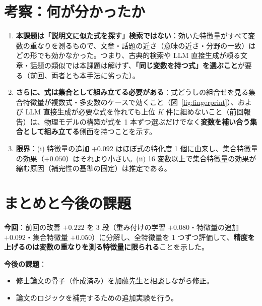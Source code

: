 \documentclass[a4j,dvipdfmx,11pt]{jresume}
\begin{document}
\section{考察：何が分かったか}\label{sec:discussion}
\begin{enumerate}[leftmargin=1.8em]
  \item \textbf{本課題は「説明文に似た式を探す」検索ではない}：効いた特徴量がすべて変数の重なりを測るもので、文章・話題の近さ（意味の近さ・分野の一致）はどの形でも効かなかった。つまり、古典的検索や LLM 直接生成が頼る文章・話題の類似では本課題は解けず、\textbf{「同じ変数を持つ式」を選ぶこと}が要る（前回、両者とも本手法に劣った）。
  \item \textbf{さらに、式は集合として組み立てる必要がある}：式どうしの組合せを見る集合特徴量が複数式・多変数のケースで効くこと（図~\ref{fig:fingerprint}）、および LLM 直接生成が必要な式を作れても上位 $K$ 件に組めないこと（前回報告）は、物理モデルの構築が式を 1 本ずつ選ぶだけでなく\textbf{変数を補い合う集合として組み立てる}側面を持つことを示す。
  \item \textbf{限界}：(i) 特徴量の追加 $+0.092$ はほぼ式の特化度 1 個に由来し、集合特徴量の効果（$+0.050$）はそれより小さい。(ii) 16 変数以上で集合特徴量の効果が縮む原因（補完性の基準の固定）は推定である。
\end{enumerate}

\section{まとめと今後の課題}
\textbf{今回}：前回の改善 $+0.222$ を 3 段（重み付けの学習 $+0.080$・特徴量の追加 $+0.092$・集合特徴量 $+0.050$）に分解し、全特徴量を 1 つずつ評価して、\textbf{精度を上げるのは変数の重なりを測る特徴量に限られる}ことを示した。

\textbf{今後の課題}：
\begin{itemize}[leftmargin=1.5em]
  \item 修士論文の骨子（作成済み）を加藤先生と相談しながら修正。
  \item 論文のロジックを補完するための追加実験を行う。
\end{itemize}
\end{document}

